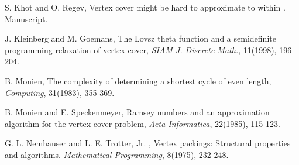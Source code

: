 \documentclass[12pt]{article}
\begin{document}
{\begin{thebibliography}{999}
 S. Khot and O. Regev, Vertex cover might be hard to
approximate to within . Manuscript.

 J. Kleinberg and M. Goemans, The Lovsz theta function and
a semidefinite programming relaxation of vertex cover, {\it SIAM J.
Discrete Math.}, 11(1998), 196-204.

 B. Monien, The complexity of determining a shortest cycle of even length, {\it Computing}, 31(1983), 355-369.

 B. Monien and E. Speckenmeyer, Ramsey numbers and an approximation algorithm for
the vertex cover problem, {\it Acta Informatica}, 22(1985), 115-123.



 G. L. Nemhauser and L. E. Trotter, Jr. , Vertex packings: Structural properties
and algorithms. {\it Mathematical Programming}, 8(1975), 232-248.
\end{thebibliography}
}
\end{document}
